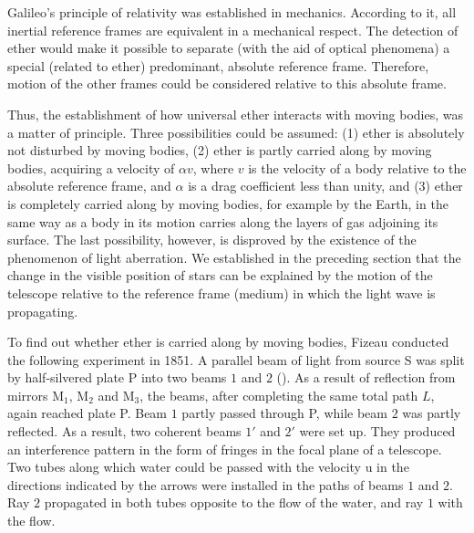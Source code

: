 Galileo's principle of relativity was established in mechanics.
According to it, all inertial reference frames are equivalent in a mechanical respect.
The detection of ether would make it possible to separate (with the aid of optical phenomena) a special (related to ether) predominant, absolute reference frame.
Therefore, motion of the other frames could be considered relative to this absolute frame.

Thus, the establishment of how universal ether interacts with moving bodies, was a matter of principle.
Three possibilities could be assumed: (1) ether is absolutely not disturbed by moving bodies, (2) ether is partly carried along by moving bodies, acquiring a velocity of $\alpha v$, where $v$ is the velocity of a body relative to the absolute reference frame, and $\alpha$ is a drag coefficient less than unity, and (3) ether is completely carried along by moving bodies, for example by the Earth, in the same way as a body in its motion carries along the layers of gas adjoining its surface.
The last possibility, however, is disproved by the existence of the phenomenon of light aberration.
We established in the preceding section that the change in the visible position of stars can be explained by the motion of the telescope relative to the reference frame (medium) in which the light wave is propagating.

To find out whether ether is carried along by moving bodies, Fizeau conducted the following experiment in 1851.
A parallel beam of light from source S was split by half-silvered plate P into two beams $1$ and $2$ ().
As a result of reflection from mirrors M$_1$, M$_2$ and M$_3$, the beams, after completing the same total path $L$, again reached plate P.
Beam $1$ partly passed through P, while beam $2$ was partly reflected.
As a result, two coherent beams $1'$ and $2'$ were set up.
They produced an interference pattern in the form of fringes in the focal plane of a telescope.
Two tubes along which water could be passed with the velocity u in the directions indicated by the arrows were installed in the paths of beams $1$ and $2$.
Ray $2$ propagated in both tubes opposite to the flow of the water, and ray $1$ with the flow.

